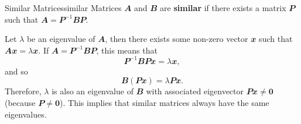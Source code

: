 \documentclass[math, code]{amznotes}
\theoremstyle{remark}
\newcommand{\zero}{\mathbf{0}}
\begin{document}
\begin{dfnbox}{Similar Matrices}{similar}
    Matrices $\mathbfit{A}$ and $\mathbfit{B}$ are {\color{red} \textbf{similar}} if there exists a matrix $\mathbfit{P}$ such that $\mathbfit{A} = \mathbfit{P}^{-1}\mathbfit{B}\mathbfit{P}$.
\end{dfnbox}
Let $\lambda$ be an eigenvalue of $\mathbfit{A}$, then there exists some non-zero vector $\mathbfit{x}$ such that $\mathbfit{Ax} = \lambda\mathbfit{x}$. If $\mathbfit{A} = \mathbfit{P}^{-1}\mathbfit{B}\mathbfit{P}$, this means that 
\begin{equation*}
    \mathbfit{P}^{-1}\mathbfit{B}\mathbfit{P}\mathbfit{x} = \lambda\mathbfit{x},
\end{equation*}
and so 
\begin{equation*}
    \mathbfit{B}(\mathbfit{Px}) = \lambda\mathbfit{Px}.
\end{equation*}
Therefore, $\lambda$ is also an eigenvalue of $\mathbfit{B}$ with associated eigenvector $\mathbfit{Px} \neq \zero$ (because $\mathbfit{P} \neq \zero$). This implies that similar matrices always have the same eigenvalues.
\end{document}
